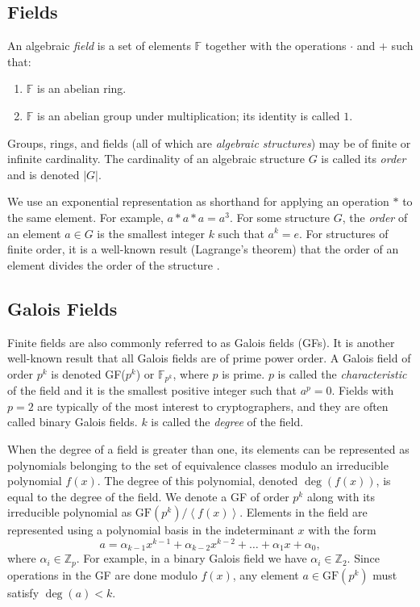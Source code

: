 \subsection{Fields}
An algebraic \emph{field} is a set of elements $\mathbb{F}$ together with the operations $\cdot$ and $+$ such that:
\begin{enumerate}
\item $\mathbb{F}$ is an abelian ring.
\item $\mathbb{F}$ is an abelian group under multiplication; its identity is called $1$.
\end{enumerate}

Groups, rings, and fields (all of which are \emph{algebraic structures}) may be of finite or infinite cardinality.
The cardinality of an algebraic structure $G$ is called its \emph{order} and is denoted $|G|$.

We use an exponential representation as shorthand for applying an operation $*$ to the same element.
For example, $a*a*a = a^3$.
For some structure $G$, the \emph{order} of an element $a \in G$ is the smallest integer $k$ such that $a^k = e$.
For structures of finite order, it is a well-known result (Lagrange's theorem) that the order of an element divides the order of the structure \cite{Gallian2012_AbstractAlgebra}.

\subsection{Galois Fields}

Finite fields are also commonly referred to as Galois fields (GFs).
It is another well-known result that all Galois fields are of prime power order.
A Galois field of order $p^k$ is denoted GF($p^k$) or $\mathbb{F}_{p^k}$, where $p$ is prime.
$p$ is called the \emph{characteristic} of the field and it is the smallest positive integer such that $a^p = 0$.
Fields with $p=2$ are typically of the most interest to cryptographers, and they are often called binary Galois fields.
$k$ is called the \emph{degree} of the field.

When the degree of a field is greater than one, its elements can be represented as polynomials belonging to the set of equivalence classes modulo an irreducible polynomial $f(x)$. 
The degree of this polynomial, denoted $\deg(f(x))$, is equal to the degree of the field.
We denote a GF of order $p^k$ along with its irreducible polynomial as $\mathrm{GF}(p^k) / \left\langle f(x) \right\rangle$.
Elements in the field are represented using a polynomial basis in the indeterminant $x$ with the form
\begin{equation*}
a = \alpha_{k-1}x^{k-1} + \alpha_{k-2}x^{k-2} + \ldots + \alpha_1 x + \alpha_0,
\end{equation*}
where $\alpha_i \in \mathbb{Z}_p$.
For example, in a binary Galois field we have $\alpha_i \in \mathbb{Z}_2$.
Since operations in the GF are done modulo $f(x)$, any element $a \in \mathrm{GF}(p^k)$ must satisfy $\deg(a) < k$.

